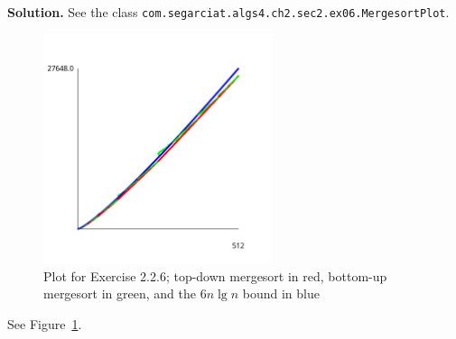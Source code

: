 \documentclass[12pt, a4paper]{article}
\newenvironment{sol}[1][Solution]
{\par\medskip\noindent \textbf{#1.} }
{\medskip}
\begin{document}
	\begin{sol}
		See the class \texttt{com.segarciat.algs4.ch2.sec2.ex06.MergesortPlot}.
		\begin{figure}
			\centering
			\includegraphics[width=0.6\textwidth]{mergesort-array-access-cost-plot}
			\caption{Plot for Exercise 2.2.6; top-down mergesort in red, bottom-up mergesort in green,
			and the $6n\lg n$ bound in blue}
			\label{ex:6}
		\end{figure}
		See Figure~\ref{ex:6}.
	\end{sol}
	\pagebreak
	\printbibliography
\end{document}
